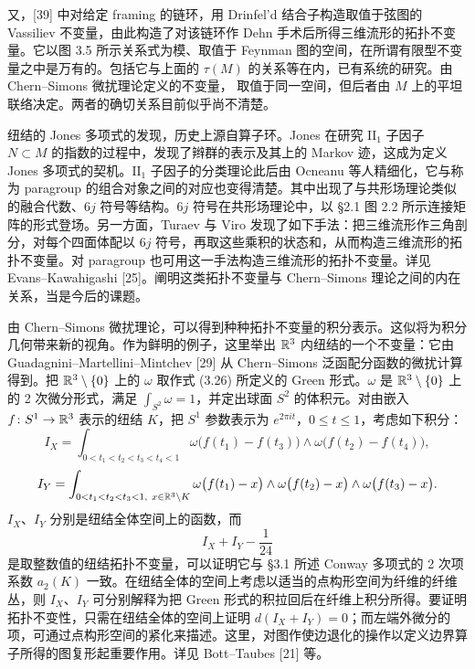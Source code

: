 
又，[39] 中对给定 framing 的链环，用 Drinfel'd 结合子构造取值于弦图的 Vassiliev 不变量，由此构造了对该链环作 Dehn 手术后所得三维流形的拓扑不变量。它以图 3.5 所示关系式为模、取值于 Feynman 图的空间，在所谓有限型不变量之中是万有的。包括它与上面的 $\tau(M)$ 的关系等在内，已有系统的研究。由 Chern--Simons 微扰理论定义的不变量，
取值于同一空间，但后者由 $M$ 上的平坦联络决定。两者的确切关系目前似乎尚不清楚。

纽结的 Jones 多项式的发现，历史上源自算子环。Jones 在研究 $\mathrm{II}_{1}$ 子因子 $N\subset M$ 的指数的过程中，发现了辫群的表示及其上的 Markov 迹，这成为定义 Jones 多项式的契机。$\mathrm{II}_{1}$ 子因子的分类理论此后由 Ocneanu 等人精细化，它与称为 paragroup 的组合对象之间的对应也变得清楚。其中出现了与共形场理论类似的融合代数、$6j$ 符号等结构。$6j$ 符号在共形场理论中，以 §2.1 图 2.2 所示连接矩阵的形式登场。另一方面，Turaev 与 Viro 发现了如下手法：把三维流形作三角剖分，对每个四面体配以 $6j$ 符号，再取这些乘积的状态和，从而构造三维流形的拓扑不变量。对 paragroup 也可用这一手法构造三维流形的拓扑不变量。详见 Evans--Kawahigashi [25]。阐明这类拓扑不变量与 Chern--Simons 理论之间的内在关系，当是今后的课题。


由 Chern--Simons 微扰理论，可以得到种种拓扑不变量的积分表示。这似将为积分几何带来新的视角。作为鲜明的例子，这里举出 $\mathbb{R}^{3}$ 内纽结的一个不变量：它由 Guadagnini--Martellini--Mintchev [29] 从 Chern--Simons 泛函配分函数的微扰计算得到。把 $\mathbb{R}^{3}\setminus\{0\}$ 上的 $\omega$ 取作式 (3.26) 所定义的 Green 形式。$\omega$ 是 $\mathbb{R}^{3}\setminus\{0\}$ 上的 2 次微分形式，满足 $\int_{S^{2}}\omega=1$，并定出球面 $S^{2}$ 的体积元。对由嵌入 $f\colon S^{1}\to\mathbb{R}^{3}$ 表示的纽结 $K$，把 $S^{1}$ 参数表示为 $e^{2\pi it}$，$0\le t\le 1$，考虑如下积分：
\[
  I_X=\int_{0<t_{1}<t_{2}<t_{3}<t_{4}<1}
  \omega\bigl(f(t_{1})-f(t_{3})\bigr)\wedge\omega\bigl(f(t_{2})-f(t_{4})\bigr),
\]
\[
  I_Y=\int_{0<t_{1}<t_{2}<t_{3}<1,\ x\in\R^{3}\setminus K}
  \omega\bigl(f(t_{1})-x\bigr)\wedge\omega\bigl(f(t_{2})-x\bigr)\wedge\omega\bigl(f(t_{3})-x\bigr).
\]
$I_X$、$I_Y$ 分别是纽结全体空间上的函数，而
\[
  I_X+I_Y-\frac{1}{24}
\]
是取整数值的纽结拓扑不变量，可以证明它与 §3.1 所述 Conway 多项式的 2 次项系数 $a_2(K)$ 一致。在纽结全体的空间上考虑以适当的点构形空间为纤维的纤维丛，则 $I_X$、$I_Y$ 可分别解释为把 Green 形式的积拉回后在纤维上积分所得。要证明拓扑不变性，只需在纽结全体的空间上证明 $d(I_X+I_Y)=0$；而左端外微分的项，可通过点构形空间的紧化来描述。这里，对图作使边退化的操作以定义边界算子所得的图复形起重要作用。详见 Bott--Taubes [21] 等。

